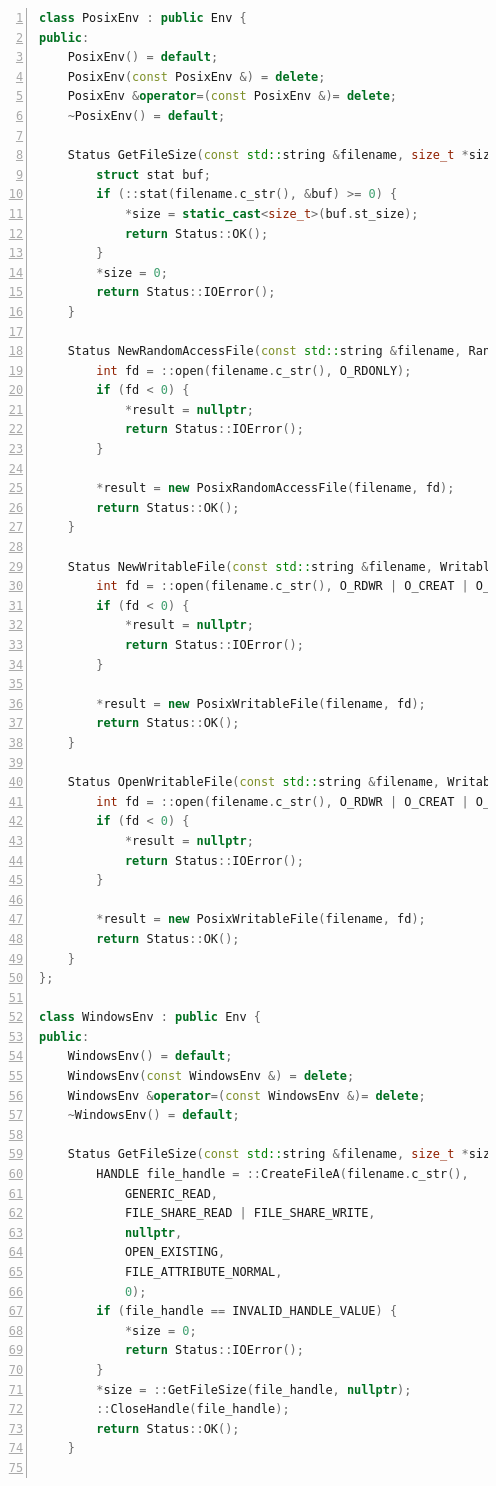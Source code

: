 \documentclass[bachelor]{thesis-uestc}
\begin{document}
\begin{lstlisting}[language=C++, basicstyle=\ttfamily\tiny, numbers=left, numberstyle=\tiny, keywordstyle=\color{blue!70}, commentstyle=\color{red!50!green!50!blue!50}, frame=shadowbox, rulesepcolor=\color{red!20!green!20!blue!20}]
class PosixEnv : public Env {
public:
    PosixEnv() = default;
    PosixEnv(const PosixEnv &) = delete;
    PosixEnv &operator=(const PosixEnv &)= delete;
    ~PosixEnv() = default;

    Status GetFileSize(const std::string &filename, size_t *size) override {
        struct stat buf;
        if (::stat(filename.c_str(), &buf) >= 0) {
            *size = static_cast<size_t>(buf.st_size);
            return Status::OK();
        }
        *size = 0;
        return Status::IOError();
    }

    Status NewRandomAccessFile(const std::string &filename, RandomAccessFile **result) override {
        int fd = ::open(filename.c_str(), O_RDONLY);
        if (fd < 0) {
            *result = nullptr;
            return Status::IOError();
        }

        *result = new PosixRandomAccessFile(filename, fd);
        return Status::OK();
    }

    Status NewWritableFile(const std::string &filename, WritableFile **result) override {
        int fd = ::open(filename.c_str(), O_RDWR | O_CREAT | O_TRUNC, 0664);
        if (fd < 0) {
            *result = nullptr;
            return Status::IOError();
        }

        *result = new PosixWritableFile(filename, fd);
        return Status::OK();
    }

    Status OpenWritableFile(const std::string &filename, WritableFile **result) override {
        int fd = ::open(filename.c_str(), O_RDWR | O_CREAT | O_APPEND, 0664);
        if (fd < 0) {
            *result = nullptr;
            return Status::IOError();
        }

        *result = new PosixWritableFile(filename, fd);
        return Status::OK();
    }
};

class WindowsEnv : public Env {
public:
    WindowsEnv() = default;
    WindowsEnv(const WindowsEnv &) = delete;
    WindowsEnv &operator=(const WindowsEnv &)= delete;
    ~WindowsEnv() = default;

    Status GetFileSize(const std::string &filename, size_t *size) override {
		HANDLE file_handle = ::CreateFileA(filename.c_str(),
			GENERIC_READ,
			FILE_SHARE_READ | FILE_SHARE_WRITE,
			nullptr,
			OPEN_EXISTING,
			FILE_ATTRIBUTE_NORMAL,
			0);
		if (file_handle == INVALID_HANDLE_VALUE) {
		    *size = 0;
			return Status::IOError();
		}
		*size = ::GetFileSize(file_handle, nullptr);
		::CloseHandle(file_handle);
        return Status::OK();
    }


\end{lstlisting}
\end{document}
